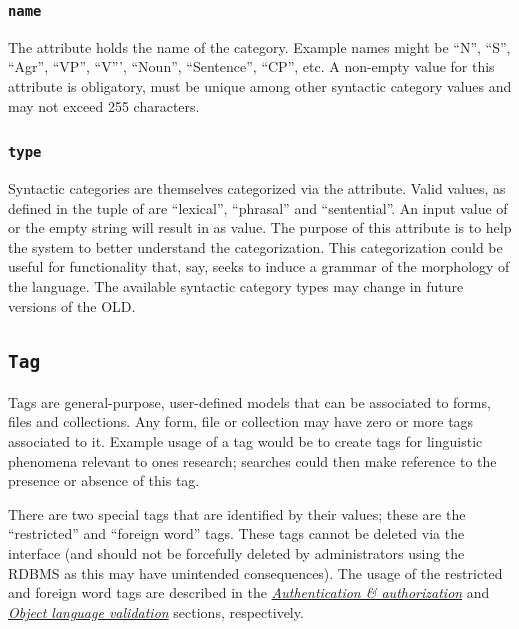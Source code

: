 \documentclass[letterpaper,10pt,english]{sphinxmanual}
\begin{document}
\subsubsection{\texttt{name}}
\label{datastructure:id53}
The  attribute holds the name of the category.  Example names might be
``N'', ``S'', ``Agr'', ``VP'', ``V''', ``Noun'', ``Sentence'', ``CP'', etc.  A non-empty value
for this attribute is obligatory, must be unique among other syntactic category
 values and may not exceed 255 characters.


\subsubsection{\texttt{type}}
\label{datastructure:id54}
Syntactic categories are themselves categorized via the  attribute.
Valid values, as defined in the  tuple of
 are ``lexical'', ``phrasal'' and ``sentential''.  An input  value of
 or the empty string will result in  as value.  The purpose of
this attribute is to help the system to better understand the categorization.
This categorization could be useful for functionality that, say, seeks to induce
a grammar of the morphology of the language.  The available syntactic category
types may change in future versions of the OLD.


\subsection{\texttt{Tag}}
\label{datastructure:tag}\label{datastructure:tag-data-structure}
Tags are general-purpose, user-defined models that can be associated to forms,
files and collections.  Any form, file or collection may have zero or more tags
associated to it.  Example usage of a tag would be to create tags for linguistic
phenomena relevant to ones research; searches could then make reference to the
presence or absence of this tag.

There are two special tags that are identified by their  values; these
are the ``restricted'' and ``foreign word'' tags.  These tags cannot be deleted via
the interface (and should not be forcefully deleted by administrators using the
RDBMS as this may have unintended consequences).  The usage of the restricted
and foreign word tags are described in the {\hyperref[interface:auth]{\emph{Authentication \& authorization}}} and
{\hyperref[interface:object-language-validation]{\emph{Object language validation}}} sections, respectively.
\end{document}
